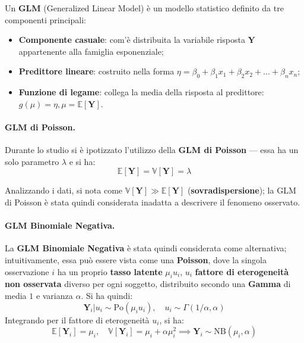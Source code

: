 Un \textbf{GLM} (Generalized Linear Model) è un modello statistico definito
da tre componenti principali: 
\begin{itemize}
    \item \textbf{Componente casuale}: com'è distribuita la variabile risposta $\mathbf{Y}$ appartenente
    alla famiglia esponenziale; 
    \item \textbf{Predittore lineare}: costruito nella forma 
    $\eta = \beta_{0} + \beta_{1}x_{1} + \beta_{2}x_{2} + ... + \beta_{n}x_{n}$;
    \item \textbf{Funzione di legame}: collega la media della risposta al predittore: 
    $g(\mu) = \eta,  \mu = \mathbb{E}[\mathbf{Y}]$.
\end{itemize}

\paragraph{GLM di Poisson.} Durante lo studio si è ipotizzato l'utilizzo della \textbf{GLM di Poisson} 
--- essa ha un solo parametro $\lambda$ e si ha:
\begin{equation}
    \mathbb{E}[\mathbf{Y}] = \mathbb{V}[\mathbf{Y}] = \lambda
\end{equation}

Analizzando i dati, si nota come $\mathbb{V}[\mathbf{Y}] \gg \mathbb{E}[\mathbf{Y}]$ (\textbf{sovradispersione}); 
la GLM di Poisson è stata quindi considerata inadatta a descrivere il fenomeno osservato.

\paragraph{GLM Binomiale Negativa.} La \textbf{GLM Binomiale Negativa} è stata quindi
considerata come alternativa; intuitivamente, essa può essere vista come una
\textbf{Poisson}, dove la singola osservazione $i$ ha un proprio \textbf{tasso latente}
$\mu_i u_i$, $u_i$ \textbf{fattore di eterogeneità non osservata} diverso per ogni soggetto,
distribuito secondo una \textbf{Gamma} di media 
$1$ e varianza $\alpha$.
Si ha quindi:
\begin{equation}
    \mathbf{Y}_{i} | u_{i} \sim \text{Po}(\mu_{i}u_{i}), \quad u_{i} \sim \Gamma(1/\alpha, \alpha)
\end{equation}
Integrando per il fattore di eterogeneità $u_i$, si ha:
\begin{equation}
    \mathbb{E}[\mathbf{Y}_{i}] = \mu_{i}, \quad \mathbb{V}[\mathbf{Y}_{i}] = \mu_{i} + \alpha\mu_{i}^{2}
    \implies \mathbf{Y}_{i} \sim \text{NB}(\mu_{i}, \alpha) 
\end{equation}

